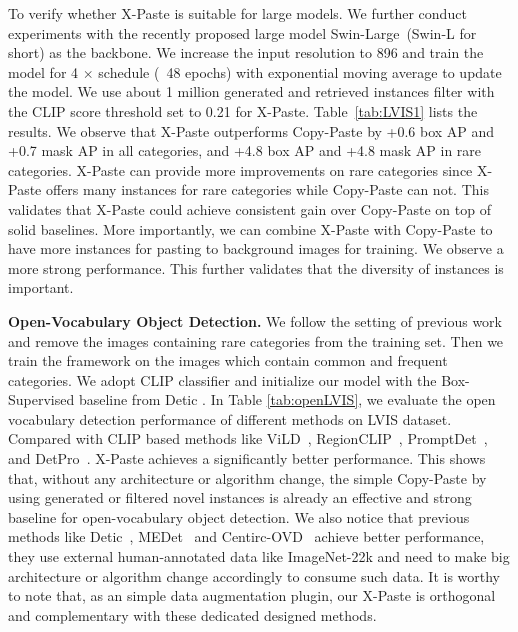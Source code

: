 \documentclass{article}
\begin{document}
To verify whether X-Paste is suitable for large models. We further conduct experiments with the recently proposed large model Swin-Large~\cite{Swin}(Swin-L for short) as the backbone. We increase the input resolution to 896 and train the model for 4 $\times$ schedule (~48 epochs) with exponential moving average to update the model. 
We use about 1 million generated and retrieved instances filter with the CLIP score threshold set to 0.21 for X-Paste. 
Table~\ref{tab:LVIS1} lists the results. We observe that X-Paste outperforms Copy-Paste by +0.6 box AP and +0.7 mask AP in all categories, and +4.8 box AP and +4.8 mask AP in rare categories. X-Paste can provide more improvements on rare categories since X-Paste offers many instances for rare categories while Copy-Paste can not. This validates that X-Paste could achieve consistent gain over Copy-Paste on top of solid baselines. More importantly, we can combine X-Paste with Copy-Paste to have more instances for pasting to background images for training. We observe a more strong performance. This further validates that the diversity of instances is important.


\noindent \textbf{Open-Vocabulary Object Detection.}  We follow the setting of previous work and remove the images containing rare categories from the training set. Then we train the framework on the images which contain common and frequent categories. We adopt CLIP classifier\cite{ViLD} and initialize our model with the Box-Supervised baseline from Detic \cite{Detic}. In Table \ref{tab:openLVIS}, we evaluate the open vocabulary detection performance of different methods on LVIS dataset. Compared with CLIP based methods like ViLD~\cite{ViLD}, RegionCLIP~\cite{RegionCLIP}, PromptDet~\cite{PromptDet}, and DetPro~\cite{DetPro}. X-Paste achieves a significantly better performance. This shows that, without any architecture or algorithm change, the simple Copy-Paste by using generated or filtered novel instances is already an effective and strong baseline for open-vocabulary object detection. We also notice that previous methods like Detic~\cite{Detic}, MEDet~\cite{MEDet} and Centirc-OVD~\cite{Centric-OVD} achieve better performance, they use external human-annotated data like ImageNet-22k and need to make big architecture or algorithm change accordingly to consume such data. It is worthy to note that, as an simple data augmentation plugin, our X-Paste is orthogonal and complementary with these dedicated designed methods.
\end{document}
